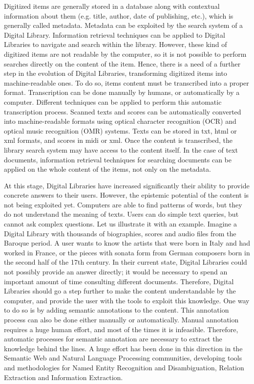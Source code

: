 Digitized items are generally stored in a database along with contextual information about them (e.g. title, author, date of publishing, etc.), which is generally called metadata. Metadata can be exploited by the search system of a Digital Library. Information retrieval techniques can be applied to Digital Libraries to navigate and search within the library. However, these kind of digitized items are not readable by the computer, so it is not possible to perform searches directly on the content of the item. Hence, there is a need of a further step in the evolution of Digital Libraries, transforming digitized items into machine-readable ones. To do so, items content must be transcribed into a proper format. Transcription can be done manually by humans, or automatically by a computer. Different techniques can be applied to perform this automatic transcription process. Scanned texts and scores can be automatically converted into machine-readable formats using optical character recognition (OCR) and optical music recognition (OMR) systems. Texts can be stored in txt, html or xml formats, and scores in midi or xml. 
Once the content is transcribed, the library search system may have access to the content itself. In the case of text documents, information retrieval techniques for searching documents can be applied on the whole content of the items, not only on the metadata. 

At this stage, Digital Libraries have increased significantly their ability to provide concrete answers to their users. However, the epistemic potential of the content is not being exploited yet. Computers are able to find patterns of words, but they do not understand the meaning of texts. Users can do simple text queries, but cannot ask complex questions. Let us illustrate it with an example. Imagine a Digital Library with thousands of biographies, scores and audio files from the Baroque period. A user wants to know the artists that were born in Italy and had worked in France, or the pieces with sonata form from German composers born in the second half of the 17th century. In their current state, Digital Libraries could not possibly provide an answer directly; it would be necessary to spend an important amount of time consulting different documents. Therefore, Digital Libraries should go a step further to make the content understandable by the computer, and provide the user with the tools to exploit this knowledge. One way to do so is by adding semantic annotations to the content. This annotation process can also be done either manually or automatically. Manual annotation requires a huge human effort, and most of the times it is infeasible. Therefore, automatic processes for semantic annotation are necessary to extract the knowledge behind the lines. A huge effort has been done in this direction in the Semantic Web and Natural Language Processing communities, developing tools and methodologies for Named Entity Recognition and Disambiguation, Relation Extraction and Information Extraction. 

